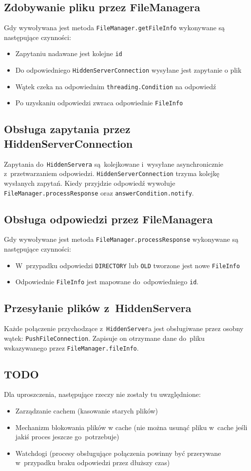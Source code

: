 \documentclass[a4paper,notitlepage]{article}
\begin{document}
\subsection{Zdobywanie pliku przez FileManagera}
Gdy wywoływana jest metoda \verb!FileManager.getFileInfo! 
wykonywane są następujące czynności:
\begin{itemize}
\item Zapytaniu nadawane jest kolejne \verb!id!
\item Do odpowiedniego \verb!HiddenServerConnection! wysyłane jest zapytanie 
o plik
\item Wątek czeka na odpowiednim \verb!threading.Condition! na odpowiedź
\item Po uzyskaniu odpowiedzi zwraca odpowiednie \verb!FileInfo!
\end{itemize}

\subsection{Obsługa zapytania przez HiddenServerConnection}
Zapytania do~\verb!HiddenServera! są~kolejkowane i~wysyłane
asynchronicznie z~przetwarzaniem odpowiedzi. \verb!HiddenServerConnection!
trzyma kolejkę wysłanych zapytań. Kiedy przyjdzie odpowiedź wywołuje 
\verb!FileManager.processResponse! oraz \verb!answerCondition.notify!.

\subsection{Obsługa odpowiedzi przez FileManagera}
Gdy wywoływane jest metoda \verb!FileManager.processResponse!
wykonywane są następujące czynności:
\begin{itemize}
\item W~przypadku odpowiedzi \verb!DIRECTORY! lub \verb!OLD! tworzone jest nowe
\verb!FileInfo!
\item Odpowiednie \verb!FileInfo! jest mapowane do~odpowiedniego 
\verb!id!.
\end{itemize}

\subsection{Przesyłanie plików z~HiddenServera}
Każde połączenie przychodzące z~\verb!HiddenServer!a jest obsługiwane przez
osobny wątek: \verb!PushFileConnection!. Zapisuje on otrzymane dane do~pliku
wskazywanego przez \verb!FileManager.fileInfo!.

\subsection{TODO}
Dla uproszczenia, następujące rzeczy nie zostały tu uwzględnione:
\begin{itemize}
\item Zarządzanie cachem (kasowanie starych plików)
\item Mechanizm blokowania plików w cache (nie można usunąć pliku w~cache 
jeśli jakiś proces jeszcze go~potrzebuje)
\item Watchdogi (procesy obsługujące połączenia powinny być przerywane
w~przypadku braku odpowiedzi przez dłuższy czas)
\end{itemize}
\end{document}
